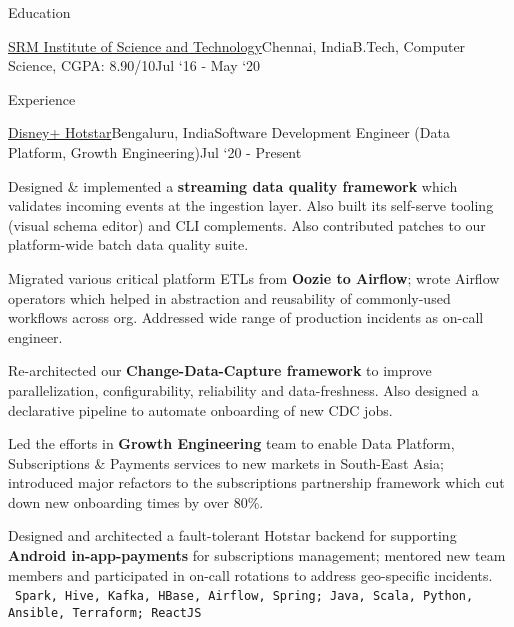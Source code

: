 \documentclass{resume}
\begin{document}
  \begin{rSection}{Education}
    \begin{rEmptySubsection}{\href{https://www.srmist.edu.in/}{SRM Institute of Science and Technology}}{Chennai, India}{B.Tech, Computer Science, CGPA: 8.90/10}{Jul `16 - May `20}
    \end{rEmptySubsection}

  \end{rSection}

  \begin{rSection}{Experience}
  
    \begin{rSubsection}{\href{https://tech.hotstar.com/}{Disney+ Hotstar}}{Bengaluru, India}{Software Development Engineer (Data Platform, Growth Engineering)}{Jul `20 - Present}
      \item Designed \& implemented a \textbf{streaming data quality framework} which validates incoming events at the ingestion layer. Also built its self-serve tooling (visual schema editor) and CLI complements. Also contributed patches to our platform-wide batch data quality suite.
      \item Migrated various critical platform ETLs from \textbf{Oozie to Airflow}; wrote Airflow operators which helped in abstraction and reusability of commonly-used workflows across org. Addressed wide range of production incidents as on-call engineer.
      \item Re-architected our \textbf{Change-Data-Capture framework} to improve parallelization, configurability, reliability and data-freshness. Also designed a declarative pipeline to automate onboarding of new CDC jobs.
      \item Led the efforts in \textbf{Growth Engineering} team to enable Data Platform, Subscriptions \& Payments services to new markets in South-East Asia; introduced major refactors to the subscriptions partnership framework which cut down new onboarding times by over 80\%.
      \item Designed and architected a fault-tolerant Hotstar backend for supporting \textbf{Android in-app-payments} for subscriptions management; mentored new team members and participated in on-call rotations to address geo-specific incidents.\\
    \textbullet\ \texttt{Spark, Hive, Kafka, HBase, Airflow, Spring; Java, Scala, Python, Ansible, Terraform; ReactJS}
    \end{rSubsection}
    
    \vspace*{-\baselineskip}


\end{rSection}
\end{document}
